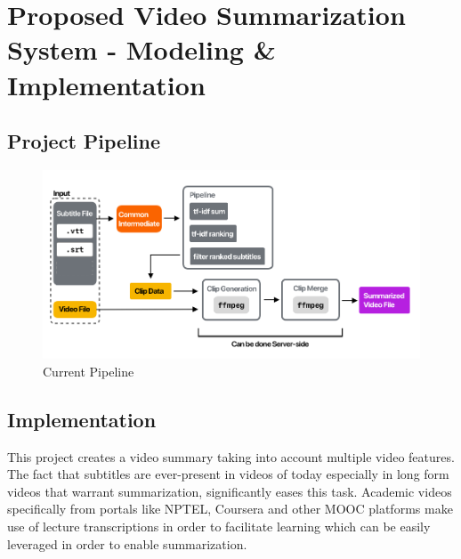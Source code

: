 
\chapter{Proposed Video Summarization System - Modeling \& Implementation} %

\label{Chapter3} %

\makeatletter
\def\BState{\State\hskip-\ALG@thistlm}
\makeatother

\section{Project Pipeline}

\begin{figure}[ht]
	\centering
		\includegraphics[width=\textwidth, keepaspectratio=true]{Graphic}	
		\caption{Current Pipeline}
		\label{currentpipeline}
\end{figure}

\section{Implementation}

This project creates a video summary taking into account multiple video features. The fact that subtitles are ever-present in videos of today especially in long form videos that warrant summarization, significantly eases this task. Academic videos specifically from portals like NPTEL, Coursera and other MOOC platforms make use of lecture transcriptions in order to facilitate learning which can be easily leveraged in order to enable summarization. 
			
